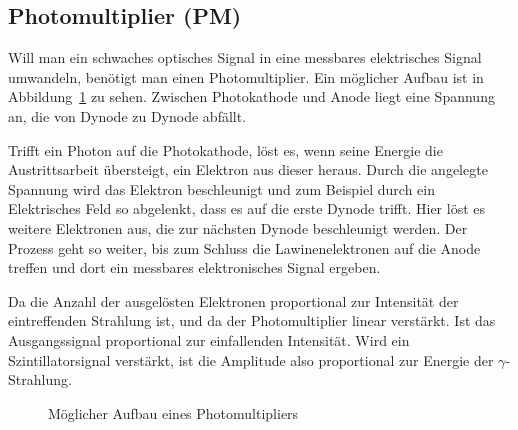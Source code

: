 \subsection{Photomultiplier (PM)}

Will man ein schwaches optisches Signal in eine messbares elektrisches Signal
umwandeln, benötigt man einen Photomultiplier. Ein möglicher Aufbau ist in
Abbildung~\ref{fig:PM} zu sehen. Zwischen Photokathode und Anode liegt eine
Spannung an, die von Dynode zu Dynode abfällt.

Trifft ein Photon auf die Photokathode, löst es, wenn seine Energie die
Austrittsarbeit übersteigt, ein Elektron aus dieser heraus. Durch die angelegte
Spannung wird das Elektron beschleunigt und zum Beispiel durch ein Elektrisches
Feld so abgelenkt, dass es auf die erste Dynode trifft. Hier löst es weitere
Elektronen aus, die zur nächsten Dynode beschleunigt werden. Der Prozess geht
so weiter, bis zum Schluss die Lawinenelektronen auf die Anode treffen und dort
ein messbares elektronisches Signal ergeben.

Da die Anzahl der ausgelösten Elektronen proportional zur Intensität der
eintreffenden Strahlung ist, und da der Photomultiplier linear verstärkt. Ist
das Ausgangssignal proportional zur einfallenden Intensität. Wird ein
Szintillatorsignal verstärkt, ist die Amplitude also proportional zur Energie
der $\gamma$-Strahlung.

\begin{figure}
    \centering
    \caption{%
        Möglicher Aufbau eines Photomultipliers
    }
    \label{fig:PM}
\end{figure}

